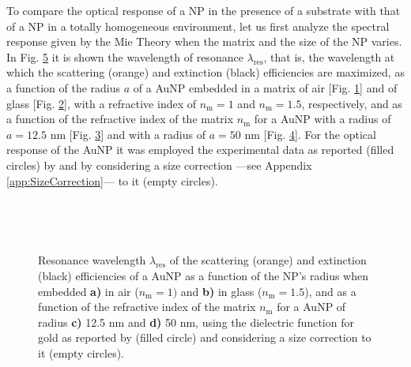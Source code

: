 
To compare the optical response of a NP in the presence of a substrate with that of a NP in a totally homogeneous environment, let us first analyze the spectral response given by the Mie Theory when the matrix and the size of the NP varies. In Fig. \ref{fig:Mie:redshift} it is shown the wavelength of resonance $\lambda_\text{res}$, that is, the wavelength at which the scattering (orange) and extinction (black) efficiencies are maximized,  as a  function of the radius $a$ of a AuNP embedded in a matrix of air [Fig. \ref{sfig:red:1}] and of glass [Fig. \ref{sfig:red:2}], with a refractive index of $n_\text{m} = 1$ and $n_\text{m} = 1.5$, respectively, and as a function of the refractive index of the matrix $n_\text{m}$ for a AuNP with a radius of {$a = 12.5$ nm} [Fig. \ref{sfig:red:3}] and with a radius of $a = 50$ nm [Fig. \ref{sfig:red:4}]. For the optical response of the AuNP it was employed the experimental data as reported (filled circles) by \citeauthor{johnson_optical_1972} \cite{johnson_optical_1972}  and by considering a size correction ---see Appendix \ref{app:SizeCorrection}--- to it (empty circles).

\begin{figure}[h!] \centering
    \def\svgwidth{.9\textwidth}
    \vspace*{-18.6em} \\
    \hspace*{-5.9em}%
        \begin{subfigure}{.20\textwidth}\caption{ }\label{sfig:red:1}\end{subfigure}%
        \begin{subfigure}{.235\textwidth}\caption{ }\label{sfig:red:2}\end{subfigure}%
        \begin{subfigure}{.20\textwidth}\caption{ }\label{sfig:red:3}\end{subfigure}%
        \begin{subfigure}{.24\textwidth}\caption{ }\label{sfig:red:4}\end{subfigure}
    \vspace*{16.5em}\\
    \caption[Spectral redshift of the scattering and extinction  efficiencies of a spherical AuNP as a function of its size and the embedding media]{Resonance wavelength $\lambda_\text{res}$ of the scattering (orange) and extinction (black) efficiencies of a AuNP as a function of the NP's radius when embedded \textbf{a)} in air ($n_\text{m} = 1)$ and \textbf{b)} in glass ($n_\text{m} = 1.5$), and as a function of the refractive index of the matrix  $n_\text{m}$ for a AuNP of radius \textbf{c)} 12.5 nm and \textbf{d)} 50 nm, using the dielectric function for gold as reported by \citeauthor{johnson_optical_1972} (filled circle) and considering a size correction to it (empty circles).}
    \label{fig:Mie:redshift}
\end{figure}

